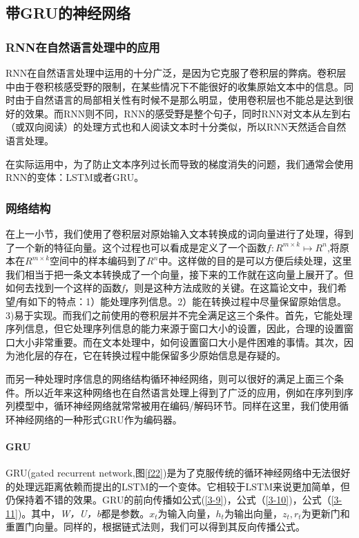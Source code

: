 \subsection{带GRU的神经网络}
\subsubsection{RNN在自然语言处理中的应用}
RNN在自然语言处理中运用的十分广泛，是因为它克服了卷积层的弊病。卷积层中由于卷积核感受野的限制，在某些情况下不能很好的收集原始文本中的信息。同时由于自然语言的局部相关性有时候不是那么明显，使用卷积层也不能总是达到很好的效果。而RNN则不同，RNN的感受野是整个句子，同时RNN对文本从左到右（或双向阅读）的处理方式也和人阅读文本时十分类似，所以RNN天然适合自然语言处理。

在实际运用中，为了防止文本序列过长而导致的梯度消失的问题，我们通常会使用RNN的变体：LSTM或者GRU。
\subsubsection{网络结构}
在上一小节，我们使用了卷积层对原始输入文本转换成的词向量进行了处理，得到了一个新的特征向量。这个过程也可以看成是定义了一个函数\(f:R^{m\times k}\mapsto R^n\),将原本在\(R^{m\times k}\)空间中的样本编码到了\(R^n\)中。这样做的目的是可以方便后续处理，这里我们相当于把一条文本转换成了一个向量，接下来的工作就在这向量上展开了。但如何去找到一个这样的函数\textit{f}，则是这种方法成败的关键。在这篇论文中，我们希望\textit{f}有如下的特点：1）能处理序列信息。2）能在转换过程中尽量保留原始信息。3)易于实现。而我们之前使用的卷积层并不完全满足这三个条件。首先，它能处理序列信息，但它处理序列信息的能力来源于窗口大小的设置，因此，合理的设置窗口大小非常重要。而在文本处理中，如何设置窗口大小是件困难的事情。其次，因为池化层的存在，它在转换过程中能保留多少原始信息是存疑的。

而另一种处理时序信息的网络结构循环神经网络，则可以很好的满足上面三个条件。所以近年来这种网络也在自然语言处理上得到了广泛的应用，例如在序列到序列模型中，循环神经网络就常常被用在编码/解码环节。同样在这里，我们使用循环神经网络的一种形式$\mathrm{GRU}$\cite{DBLP:journals/corr/ChungGCB14}作为编码器。

\paragraph{GRU}
GRU(gated recurrent network,图\ref{f22})是为了克服传统的循环神经网络中无法很好的处理远距离依赖而提出的$\mathrm{LSTM}$的一个变体。它相较于$\mathrm{LSTM}$来说更加简单，但仍保持着不错的效果\cite{DBLP:journals/corr/ChungGCB14}。GRU的前向传播如公式(\ref{3-9})，公式（\ref{3-10})，公式（\ref{3-11})。其中，\textit{W，U，b}都是参数。\(x_t\)为输入向量，\(h_t\)为输出向量，\(z_t,r_t\)为更新门和重置门向量。同样的，根据链式法则，我们可以得到其反向传播公式。

